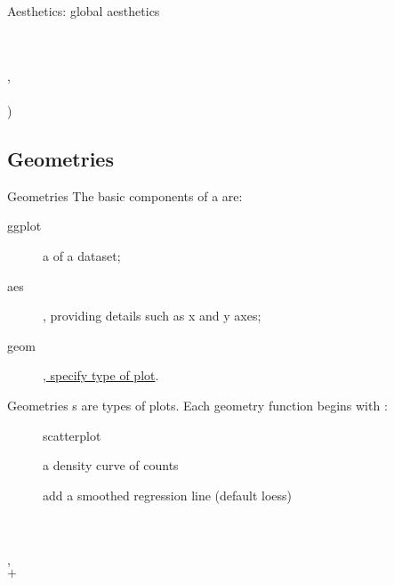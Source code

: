 \documentclass{beamer}
\begin{document}
\begin{frame}{Aesthetics: global aesthetics}
\begin{example}
 \pipe {} \\
 \\
\quad {}, \\
\qquad \quad {} \\
) 
\end{example}

\end{frame}


\subsection{Geometries}
\begin{frame}{Geometries}
The basic components of a  are:
\begin{description}
\item[ggplot]  a  of a dataset;
\item [aes] , providing details such as x and y axes;
\item [geom] \underline{, specify type of plot}.
\end{description}
\end{frame}

\begin{frame}{Geometries}
s are types of plots. Each geometry function begins with :
\begin{description}
\item[] 
\item[] scatterplot
\item[]
\item[] a density curve of counts
\item[] add a smoothed regression line (default loess)
\end{description}

\pause

\begin{example}
 \pipe {} \\
 \\
\quad {}, \\
\qquad \quad {} $+$ \\
\quad {} 
\end{example}
\end{frame}
\end{document}
